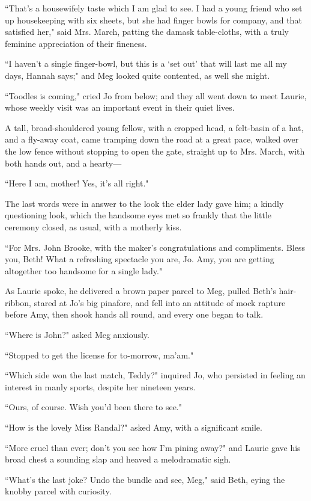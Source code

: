 ``That's a housewifely taste which I am glad to see. I
had a young friend who set up housekeeping with six sheets, but she had
finger bowls for company, and that satisfied her," said Mrs. March,
patting the damask table-cloths, with a truly feminine appreciation of
their fineness.

``I haven't a single finger-bowl, but this is a
`set out' that will last me all my
days, Hannah says;" and Meg looked quite contented, as well she might.

``Toodles is coming," cried Jo from below; and they all went down to meet
Laurie, whose weekly visit was an important event in their quiet lives.

A tall, broad-shouldered young fellow, with a cropped head, a felt-basin
of a hat, and a fly-away coat, came tramping down the road at a great
pace, walked over the low fence without stopping to open the gate,
straight up to Mrs. March, with both hands out, and a hearty---

``Here I am, mother! Yes, it's all right."

The last words were in answer to the look the elder lady gave him; a
kindly questioning look, which the handsome eyes met so frankly that the
little ceremony closed, as usual, with a motherly kiss.

``For Mrs. John Brooke, with the maker's congratulations
and compliments. Bless you, Beth! What a refreshing spectacle you are,
Jo. Amy, you are getting altogether too handsome for a single lady."

As Laurie spoke, he delivered a brown paper parcel to Meg, pulled
Beth's hair-ribbon, stared at Jo's big
pinafore, and fell into an attitude of mock rapture before Amy, then
shook hands all round, and every one began to talk.

``Where is John?" asked Meg anxiously.

``Stopped to get the license for to-morrow, ma'am."

``Which side won the last match, Teddy?" inquired Jo, who persisted in
feeling an interest in manly sports, despite her nineteen years.

``Ours, of course. Wish you'd been there to see."

``How is the lovely Miss Randal?" asked Amy, with a significant smile.

``More cruel than ever; don't you see how
I'm pining away?" and Laurie gave his broad chest a
sounding slap and heaved a melodramatic sigh.

``What's the last joke? Undo the bundle and see, Meg,"
said Beth, eying the knobby parcel with curiosity.

